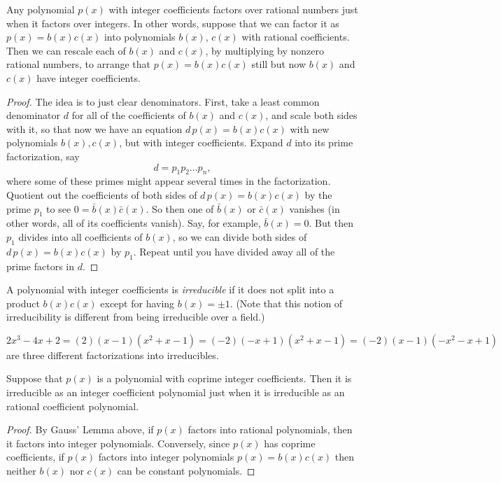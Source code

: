 \begin{lemma}
Any polynomial \(p(x)\) with integer coefficients factors over rational numbers just when it factors over integers.
In other words, suppose that we can factor it as \(p(x)=b(x)c(x)\) into polynomials \(b(x)\), \(c(x)\) with rational coefficients.
Then we can rescale each of \(b(x)\) and \(c(x)\), by multiplying by nonzero rational numbers, to arrange that \(p(x)=b(x)c(x)\) still but now \(b(x)\) and \(c(x)\) have integer coefficients.
\end{lemma}
\begin{proof}
The idea is to just clear denominators.
First, take a least common denominator \(d\) for all of the coefficients of \(b(x)\) and \(c(x)\), and scale both sides with it, so that now we have an equation \(d \, p(x)=b(x)c(x)\) with new polynomials \(b(x), c(x)\), but with integer coefficients.
Expand \(d\) into its prime factorization, say
\[
d=p_1 p_2 \dots p_n, 
\]
where some of these primes might appear several times in the factorization.
Quotient out the coefficients of both sides of \(d \, p(x)=b(x)c(x)\) by the prime \(p_1\) to see \(0=\bar{b}(x)\bar{c}(x)\).
So then one of \(\bar{b}(x)\) or \(\bar{c}(x)\) vanishes (in other words, all of its coefficients vanish).
Say, for example, \(\bar{b}(x)=0\).
But then \(p_1\) divides into all coefficients of \(b(x)\), so we can divide both sides of \(d \, p(x)=b(x)c(x)\) by \(p_1\).
Repeat until you have divided away all of the prime factors in \(d\).
\end{proof}
A polynomial with integer coefficients is \emph{irreducible}%
%
% 
%
if it does not split into a product \(b(x)c(x)\) except for having \(b(x)=\pm 1\).
(Note that this notion of irreducibility is different from being irreducible over a field.)
\begin{example}
\[
2x^3-4x+2=(2)(x-1)(x^2+x-1)=(-2)(-x+1)(x^2+x-1)=(-2)(x-1)(-x^2-x+1)
\]
are three different factorizations into irreducibles.
\end{example}
\begin{corollary}\label{corollary:coprime.coeffs}
Suppose that \(p(x)\) is a polynomial with coprime integer coefficients.
Then it is irreducible as an integer coefficient polynomial just when it is irreducible as an rational coefficient polynomial.
\end{corollary}
\begin{proof}
By Gauss' Lemma above, if \(p(x)\) factors into rational polynomials, then it factors into integer polynomials.
Conversely, since \(p(x)\) has coprime coefficients, if \(p(x)\) factors into integer polynomials \(p(x) = b(x)c(x)\) then neither \(b(x)\) nor \(c(x)\) can be constant polynomials. 
\end{proof}
